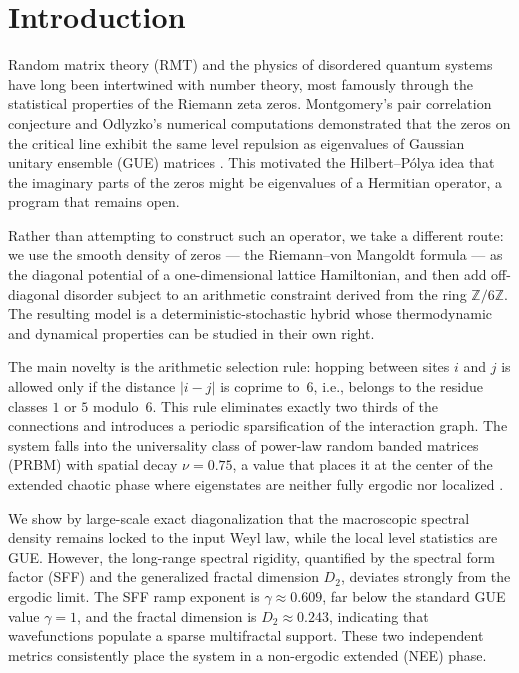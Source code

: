 \documentclass[aps,prl,preprint,superscriptaddress,floatfix]{revtex4-2}
\begin{document}
\begin{abstract}
thus provides a clean example of an arithmetic NEE phase in a tunable PRBM setting, with potential connections to noncommutative geometry where the gauge group center is exactly $\mathbb{Z}/6\mathbb{Z}$.
\end{abstract}

\maketitle

\section{Introduction}

Random matrix theory (RMT) and the physics of disordered quantum systems have long been intertwined with number theory, most famously through the statistical properties of the Riemann zeta zeros. Montgomery's pair correlation conjecture and Odlyzko's numerical computations demonstrated that the zeros on the critical line exhibit the same level repulsion as eigenvalues of Gaussian unitary ensemble (GUE) matrices \cite{Montgomery1973,Odlyzko2001}. This motivated the Hilbert--P\'olya idea that the imaginary parts of the zeros might be eigenvalues of a Hermitian operator, a program that remains open.

Rather than attempting to construct such an operator, we take a different route: we use the smooth density of zeros — the Riemann--von Mangoldt formula — as the diagonal potential of a one-dimensional lattice Hamiltonian, and then add off-diagonal disorder subject to an arithmetic constraint derived from the ring $\mathbb{Z}/6\mathbb{Z}$. The resulting model is a deterministic-stochastic hybrid whose thermodynamic and dynamical properties can be studied in their own right.

The main novelty is the arithmetic selection rule: hopping between sites $i$ and $j$ is allowed only if the distance $|i-j|$ is coprime to~6, i.e., belongs to the residue classes $1$ or $5$ modulo~6. This rule eliminates exactly two thirds of the connections and introduces a periodic sparsification of the interaction graph. The system falls into the universality class of power-law random banded matrices (PRBM) with spatial decay $\nu=0.75$, a value that places it at the center of the extended chaotic phase where eigenstates are neither fully ergodic nor localized \cite{Mirlin1996}.

We show by large-scale exact diagonalization that the macroscopic spectral density remains locked to the input Weyl law, while the local level statistics are GUE. However, the long-range spectral rigidity, quantified by the spectral form factor (SFF) and the generalized fractal dimension $D_2$, deviates strongly from the ergodic limit. The SFF ramp exponent is $\gamma \approx 0.609$, far below the standard GUE value $\gamma=1$, and the fractal dimension is $D_2 \approx 0.243$, indicating that wavefunctions populate a sparse multifractal support. These two independent metrics consistently place the system in a non-ergodic extended (NEE) phase.
\end{document}
